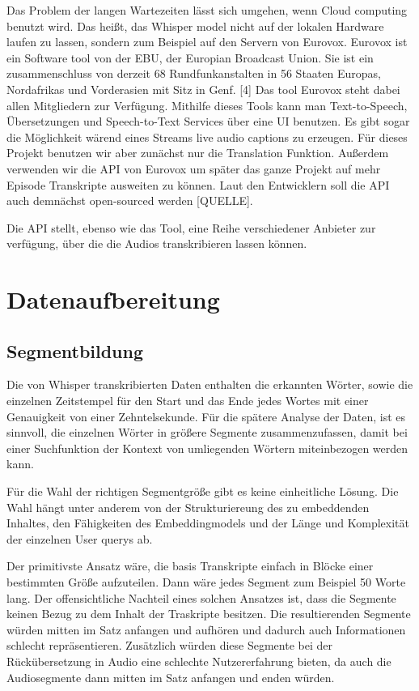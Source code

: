 Das Problem der langen Wartezeiten lässt sich umgehen, wenn Cloud computing benutzt wird.
Das heißt, das Whisper model nicht auf der lokalen Hardware laufen zu lassen, sondern zum Beispiel auf den Servern von Eurovox. 
Eurovox ist ein Software tool von der EBU, der Europian Broadcast Union. 
Sie ist ein zusammenschluss von derzeit 68 Rundfunkanstalten in 56 Staaten Europas, Nordafrikas und Vorderasien mit Sitz in Genf. [4] 
Das tool Eurovox steht dabei allen Mitgliedern zur Verfügung.  
Mithilfe dieses Tools kann man Text-to-Speech, Übersetzungen und Speech-to-Text Services über eine UI benutzen. 
Es gibt sogar die Möglichkeit wärend eines Streams live audio captions zu erzeugen. 
Für dieses Projekt benutzen wir aber zunächst nur die Translation Funktion. 
Außerdem verwenden wir die API von Eurovox um später das ganze Projekt auf mehr Episode Transkripte ausweiten zu können. 
Laut den Entwicklern soll die API auch demnächst open-sourced werden [QUELLE].

Die API stellt, ebenso wie das Tool, eine Reihe verschiedener Anbieter zur verfügung, über die die Audios transkribieren lassen können. 

\section{Datenaufbereitung}

\subsection{Segmentbildung}

Die von Whisper transkribierten Daten enthalten die erkannten Wörter, sowie die einzelnen Zeitstempel für den Start und das Ende jedes Wortes mit einer Genauigkeit von einer Zehntelsekunde.
Für die spätere Analyse der Daten, ist es sinnvoll, die einzelnen Wörter in größere Segmente zusammenzufassen, damit bei einer Suchfunktion der Kontext von umliegenden Wörtern miteinbezogen werden kann.

Für die Wahl der richtigen Segmentgröße gibt es keine einheitliche Lösung.
Die Wahl hängt unter anderem von der Strukturiereung des zu embeddenden Inhaltes, den Fähigkeiten des Embeddingmodels und der Länge und Komplexität der einzelnen User querys ab.

Der primitivste Ansatz wäre, die basis Transkripte einfach in Blöcke einer bestimmten Größe aufzuteilen.
Dann wäre jedes Segment zum Beispiel 50 Worte lang.
Der offensichtliche Nachteil eines solchen Ansatzes ist, dass die Segmente keinen Bezug zu dem Inhalt der Traskripte besitzen.
Die resultierenden Segmente würden mitten im Satz anfangen und aufhören und dadurch auch Informationen schlecht repräsentieren.
Zusätzlich würden diese Segmente bei der Rückübersetzung in Audio eine schlechte Nutzererfahrung bieten, da auch die Audiosegmente dann mitten im Satz anfangen und enden würden.  

